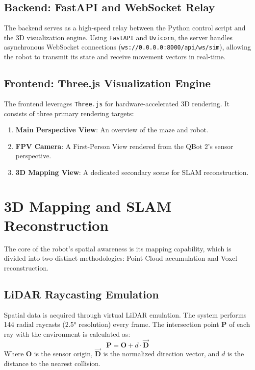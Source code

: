 \documentclass[12pt, a4paper]{article}
\begin{document}
\subsection{Backend: FastAPI and WebSocket Relay}
The backend serves as a high-speed relay between the Python control script and the 3D visualization engine. Using \texttt{FastAPI} and \texttt{Uvicorn}, the server handles asynchronous WebSocket connections (\texttt{ws://0.0.0.0:8000/api/ws/sim}), allowing the robot to transmit its state and receive movement vectors in real-time.

\subsection{Frontend: Three.js Visualization Engine}
The frontend leverages \texttt{Three.js} for hardware-accelerated 3D rendering. It consists of three primary rendering targets:
\begin{enumerate}
    \item \textbf{Main Perspective View}: An overview of the maze and robot.
    \item \textbf{FPV Camera}: A First-Person View rendered from the QBot 2's sensor perspective.
    \item \textbf{3D Mapping View}: A dedicated secondary scene for SLAM reconstruction.
\end{enumerate}

\section{3D Mapping and SLAM Reconstruction}
The core of the robot's spatial awareness is its mapping capability, which is divided into two distinct methodologies: Point Cloud accumulation and Voxel reconstruction.

\subsection{LiDAR Raycasting Emulation}
Spatial data is acquired through virtual LiDAR emulation. The system performs 144 radial raycasts (2.5° resolution) every frame. The intersection point $\mathbf{P}$ of each ray with the environment is calculated as:
\begin{equation}
    \mathbf{P} = \mathbf{O} + d \cdot \vec{\mathbf{D}}
\end{equation}
Where $\mathbf{O}$ is the sensor origin, $\vec{\mathbf{D}}$ is the normalized direction vector, and $d$ is the distance to the nearest collision.
\end{document}

